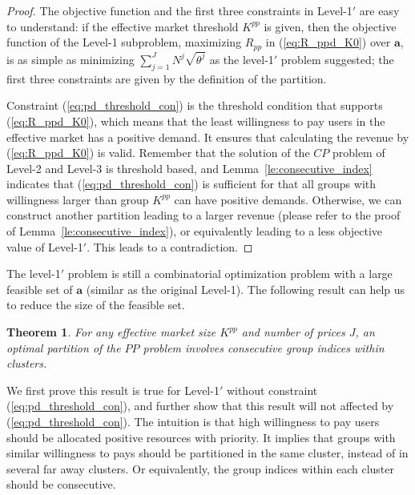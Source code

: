 \documentclass[twocolumn,10pt,twosided]{IEEEtran}
\newtheorem{theorem}{Theorem}
\begin{document}
\begin{proof}
The objective function and the first three constraints in Level-1$'$ are easy to understand:
if the effective market threshold $K^{pp}$ is given, then the objective function of the Level-1 subproblem, maximizing $R_{pp}$ in (\ref{eq:R_ppd_K0}) over $\boldsymbol{a}$, is as simple as minimizing  $\sum_{j=1}^{J}{N^j}\sqrt{{\theta^j}}$ as the level-1$'$ problem suggested;
the first three constraints are given by the definition of the partition.

Constraint (\ref{eq:pd_threshold_con}) is the threshold condition that supports  (\ref{eq:R_ppd_K0}), which means that the least willingness to pay users in the effective market has a positive demand.  It ensures that calculating the revenue by (\ref{eq:R_ppd_K0}) is valid. Remember that the solution of the $CP$ problem of Level-2 and Level-3 is threshold based, and Lemma~\ref{le:consecutive_index} indicates that (\ref{eq:pd_threshold_con}) is sufficient for that all groups with willingness larger than group $K^{pp}$ can have positive demands. Otherwise, we can construct another partition leading to a larger revenue (please refer to the proof of Lemma~\ref{le:consecutive_index}), or equivalently leading to a less objective value of Level-1$'$. This leads to a contradiction.
\end{proof}


The level-1$'$ problem is still a combinatorial optimization problem with a large feasible set of $\boldsymbol{a}$ (similar as the original Level-1). The following result can help us to reduce the size of the feasible set.
\begin{theorem}
\label{th:consecutive}
For any effective market size $K^{pp}$ and number of prices $J$,  an optimal partition of the $PP$ problem involves consecutive group indices within clusters.
\end{theorem}

 We first prove this result is true for Level-1$'$ without constraint (\ref{eq:pd_threshold_con}), and further show that this result will not affected by (\ref{eq:pd_threshold_con}). The intuition is that high willingness to pay users should be allocated positive resources with priority. It implies that groups with similar willingness to pays should be partitioned in the same cluster, instead of in several far away clusters. Or equivalently, the group indices within each cluster should be consecutive.
\end{document}

